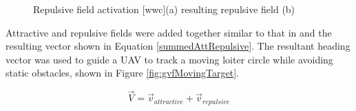 \documentclass[numbered,pdftex]{ohio-etd}
\begin{document}
\begin{figure}[H]
	\begin{subfigmatrix}{2}%
		\centering	
		\hspace*{0mm}
	\end{subfigmatrix}
	\caption{Repulsive field activation [wwc](a) resulting repulsive field (b)}
	\label{fig:tanhICUAS2018}
\end{figure}


Attractive and repulsive fields were added together similar to that in \cite{panagou_motion_2014} and the resulting vector shown in Equation \ref{summedAttRepulsive}. The resultant heading vector was used to guide a UAV to track a moving loiter circle while avoiding static obstacles, shown in Figure \ref{fig:gvfMovingTarget}.

\begin{equation}
\vec{V} = \vec{v}_{attractive}+\vec{v}_{repulsive}
\label{summedAttRepulsive}
\end{equation}
\end{document}
